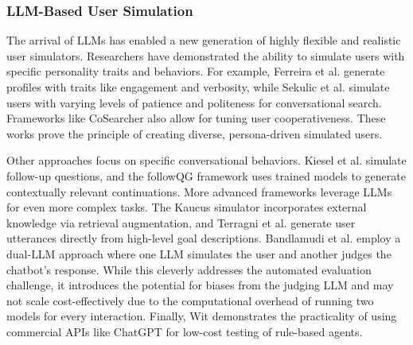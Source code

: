 \subsubsection{LLM-Based User Simulation}

The arrival of \acp{LLM} has enabled a new generation
of highly flexible and realistic user simulators.
Researchers have demonstrated the ability
to simulate users with specific personality traits and behaviors.
For example, Ferreira et al. \autocite{ferreiraMultitraitUserSimulation2024}
generate profiles with traits like engagement and verbosity,
while Sekulic et al. \autocite{sekulicSimulatingConversationalSearch2024}
simulate users with varying levels of patience and politeness for conversational search.
Frameworks like CoSearcher \autocite{salleStudyingEffectivenessConversational2021}
also allow for tuning user cooperativeness.
These works prove the principle of creating diverse, persona-driven simulated users.

Other approaches focus on specific conversational behaviors.
Kiesel et al. \autocite{kieselSimulatingFollowUpQuestions2024}
simulate follow-up questions,
and the followQG framework \autocite{bImprovingAsynchronousInterview2021}
uses trained models to generate contextually relevant continuations.
More advanced frameworks leverage \acp{LLM} for even more complex tasks.
The Kaucus simulator \autocite{dholeKAUCUSKnowledgeAugmented2024}
incorporates external knowledge via retrieval augmentation,
and Terragni et al. \autocite{terragniInContextLearningUser2023}
generate user utterances directly from high-level goal descriptions.
Bandlamudi et al. \autocite{bandlamudiFrameworkEnableTest2024}
employ a dual-\ac{LLM} approach where
one \ac{LLM} simulates the user and
another judges the chatbot's response.
While this cleverly addresses the automated evaluation challenge,
it introduces the potential for biases from the judging LLM
and may not scale cost-effectively due to the computational overhead
of running two models for every interaction.
Finally, Wit \autocite{dewitLeveragingLargeLanguage2024}
demonstrates the practicality of using commercial APIs like ChatGPT
for low-cost testing of rule-based agents.

